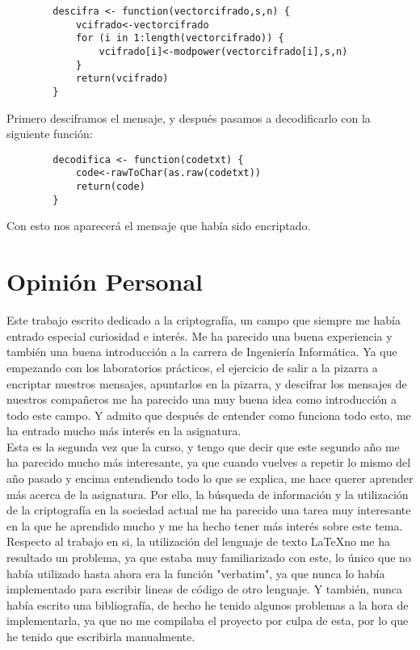 \documentclass[12pt,a4paper]{book}
\theoremstyle{change}
\begin{document}
	\begin{verbatim}
		descifra <- function(vectorcifrado,s,n) {
			vcifrado<-vectorcifrado
			for (i in 1:length(vectorcifrado)) {
				vcifrado[i]<-modpower(vectorcifrado[i],s,n)  
			}
			return(vcifrado)
		}
	\end{verbatim}
	\vspace{1cm}
	Primero desciframos el mensaje, y después pasamos a decodificarlo con la siguiente función:
	
	\begin{verbatim}
		decodifica <- function(codetxt)	{
			code<-rawToChar(as.raw(codetxt))
			return(code)
		}
	\end{verbatim}
	\vspace{5cm}
	Con esto nos aparecerá el mensaje que había sido encriptado.
	
	\section{Opinión Personal}
	Este trabajo escrito dedicado a la criptografía, un campo que siempre me había entrado especial curiosidad e interés. Me ha parecido una buena experiencia y también una buena introducción a la carrera de Ingeniería Informática. Ya que empezando con los laboratorios prácticos, el ejercicio de salir a la pizarra a encriptar nuestros mensajes, apuntarlos en la pizarra, y descifrar los mensajes de nuestros compañeros me ha parecido una muy buena idea como introducción a todo este campo. Y admito que después de entender como funciona todo esto, me ha entrado mucho más interés en la asignatura.\\
	Esta es la segunda vez que la curso, y tengo que decir que este segundo año me ha parecido mucho más interesante, ya que cuando vuelves a repetir lo mismo del año pasado y encima entendiendo todo lo que se explica, me hace querer aprender más acerca de la asignatura. Por ello, la búsqueda de información y la utilización de la criptografía en la sociedad actual me ha parecido una tarea muy interesante en la que he aprendido mucho y me ha hecho tener más interés sobre este tema.\\
	Respecto al trabajo en si, la utilización del lenguaje de texto \LaTeX no me ha resultado un problema, ya que estaba muy familiarizado con este, lo único que no había utilizado hasta ahora era la función "verbatim", ya que nunca lo había implementado para escribir lineas de código de otro lenguaje. Y también, nunca había escrito una bibliografía, de hecho he tenido algunos problemas a la hora de implementarla, ya que no me compilaba el proyecto por culpa de esta, por lo que he tenido que escribirla manualmente.\\
\end{document}
